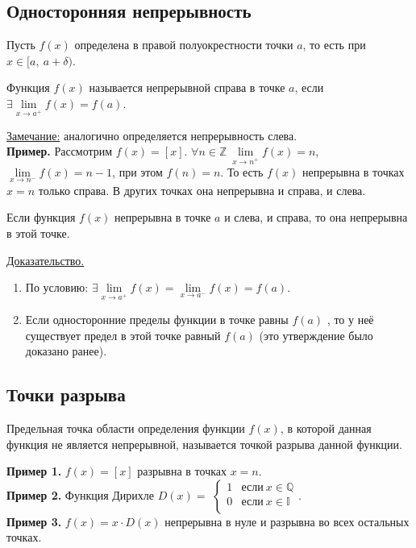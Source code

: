 \documentclass{article}
\begin{document}
\subsection{Односторонняя непрерывность}
Пусть \(f(x)\) определена в правой полуокрестности точки \(a\), то есть при \(x \in {[a,\ a + \delta)}\).
\begin{definition}
    Функция \(f(x)\) называется непрерывной справа в точке \(a\), если \(\exists \lim\limits_{x \to a^+}f(x) = f(a)\).   
\end{definition} 
\noindent
\underline{Замечание:} аналогично определяется непрерывность слева.\\
\textbf{Пример.} Рассмотрим \(\displaystyle f(x) = \left[x\right]\). \(\displaystyle \forall n \in \mathbb{Z}\ \lim\limits_{x \to n^+}f(x) = n\), \(\lim\limits_{x \to n^-}f(x) = n - 1\), при этом \(f(n) = n\). 
То есть \(f(x)\) непрерывна в точках \(x = n\) только справа. В других точках она непрерывна и справа, и слева.

\begin{theorem}
    Если функция \(f(x)\) непрерывна в точке \(a\) и слева, и справа, то она непрерывна в этой точке.  
\end{theorem}
\noindent
\underline{Доказательство.}
\begin{enumerate}
    \item По условию: \(\exists \lim\limits_{x \to a^+}f(x) = \lim\limits_{x \to a^-}f(x) = f(a)\).
    \item Если односторонние пределы функции в точке равны \(f(a)\) , то у неё существует предел в этой точке равный \(f(a)\) (это утверждение было доказано ранее). 
\end{enumerate}

\subsection{Точки разрыва}
\begin{definition}
    Предельная точка области определения функции \(f(x)\), в которой данная функция не является непрерывной, называется точкой разрыва данной функции. 
\end{definition}
\noindent
\textbf{Пример 1.} \(f(x) = \left[x\right]\) разрывна в точках \(x = n\).\\
\textbf{Пример 2.} Функция Дирихле \(D(x) =\) 
\(
\begin{cases}
    1 & \text{если}\ x \in \mathbb{Q}\\
    0 & \text{если}\ x \in \mathbb{I}\\  
\end{cases}
\).\\
\textbf{Пример 3.} \(f(x) = x \cdot D(x)\) непрерывна в нуле и разрывна во всех остальных точках. 
\end{document}
